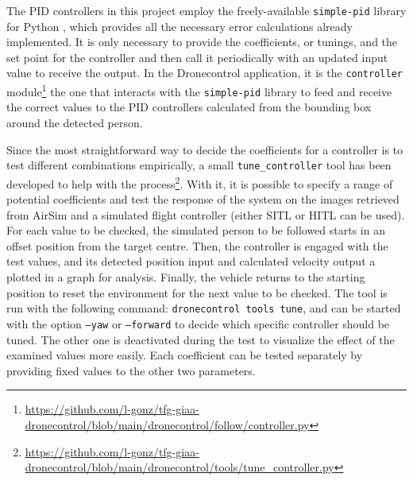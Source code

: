 The PID controllers in this project employ the freely-available \texttt{simple-pid} library for Python \cite{pid-library}, which provides all the necessary error calculations already implemented.
It is only necessary to provide the coefficients, or tunings, and the set point for the controller and then call it periodically with an updated input value to receive the output.
In the Dronecontrol application, it is the \texttt{controller} module\footnote{\url{https://github.com/l-gonz/tfg-giaa-dronecontrol/blob/main/dronecontrol/follow/controller.py}} the one that interacts with the \texttt{simple-pid} library to feed and receive the correct values to the PID controllers calculated from the bounding box around the detected person.

Since the most straightforward way to decide the coefficients for a controller is to test different combinations empirically, a small \texttt{tune\_controller} tool has been developed to help with the process\footnote{\url{https://github.com/l-gonz/tfg-giaa-dronecontrol/blob/main/dronecontrol/tools/tune_controller.py}}.
With it, it is possible to specify a range of potential coefficients and test the response of the system on the images retrieved from AirSim and a simulated flight controller (either SITL or HITL can be used).
For each value to be checked, the simulated person to be followed starts in an offset position from the target centre.
Then, the controller is engaged with the test values, and its detected position input and calculated velocity output a plotted in a graph for analysis.
Finally, the vehicle returns to the starting position to reset the environment for the next value to be checked.
The tool is run with the following command: \texttt{dronecontrol tools tune}, and can be started with the option \texttt{--yaw} or \texttt{--forward} to decide which specific controller should be tuned.
The other one is deactivated during the test to visualize the effect of the examined values more easily.
Each coefficient can be tested separately by providing fixed values to the other two parameters.

